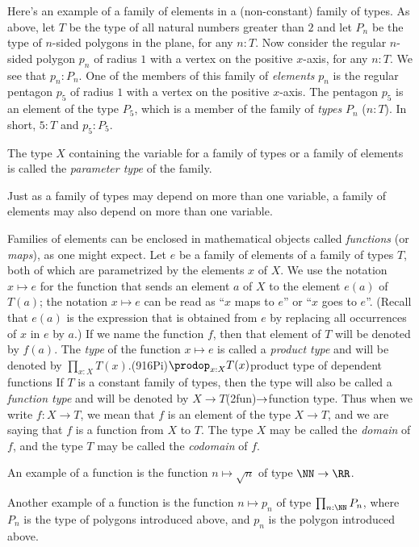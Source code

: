 Here's an example of a family of elements in a (non-constant) family of types.
As above, let $T$ be the type of all natural numbers greater than $2$ and let
$P_n$ be the type of $n$-sided polygons in the plane, for any $n:T$.
Now consider the regular $n$-sided polygon $p_n$ of radius $1$ with
a vertex on the positive $x$-axis, for any $n:T$.  We see that $p_n : P_n$.
One of the members of this family of \emph{elements} $p_n$ is the regular
pentagon $p_5$ of radius $1$ with a vertex on the positive $x$-axis.
The pentagon $p_5$ is an element of the type $P_5$, which is a member of the
family of \emph{types} $P_n$ ($n:T$). In short, $5:T$ and $p_5 : P_5$.

The type $X$ containing the variable for a family of types or a family of elements is called the \emph{parameter type} of
the family.

Just as a family of types may depend on more than one variable, a family of elements may also depend on more than one variable.

Families of elements can be enclosed in mathematical objects called \emph{functions} (or \emph{maps}), as one might
expect.
Let $e$ be a family of elements of a family of types $T$,
both of which are parametrized by the elements $x$ of $X$.  We use the notation $x \mapsto e$ for the function that sends an element $a$ of $X$
to the element $e(a)$ of $T(a)$; the notation $x \mapsto e$ can be read as ``$x$ maps to $e$'' or ``$x$ goes to $e$''.  (Recall that $e(a)$ is
the expression that is obtained from $e$ by replacing all occurrences of $x$ in $e$ by $a$.)  If we name the function $f$, then that element of
$T$ will be denoted by $f(a)$.  The \emph{type} of the function $x \mapsto e$ is called a \emph{product type} and will be denoted by
$\prod_{x:X} T(x)$.\glossary(916Pi){$\prodop_{x:X}T(x)$}{product type of dependent functions}
If $T$ is a constant family of types, then the type will also be
called a \emph{function type} and will be denoted by $X \to T$\glossary(2fun){$\protect\to$}{function type}.  Thus when we write $f : X \to T$,
we mean that $f$ is an element of the type $X \to T$, and we are saying that $f$ is a function from $X$ to $T$.  The type $X$ may be called the
\emph{domain} of $f$, and the type $T$ may be called the \emph{codomain} of $f$.

An example of a function is the function $n \mapsto \sqrt n$ of type $\NN \to \RR$.

Another example of a function is the function $n \mapsto p_n$ of type $\prod_{n:\NN} P_n$, where $P_n$ is the type of polygons introduced above,
and $p_n$ is the polygon introduced above.

